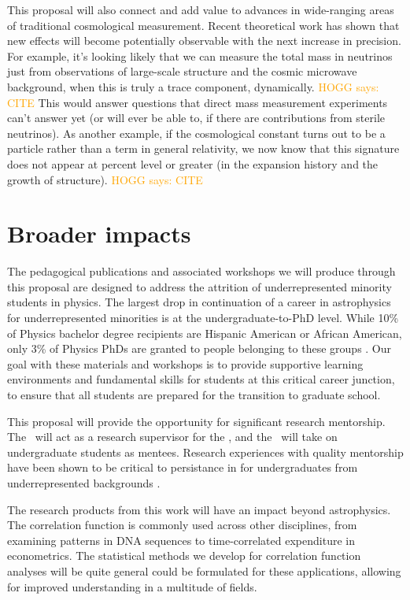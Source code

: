\documentclass[12pt, fullpage, letterpaper]{article}
\newcommand{\HOGG}[1]{\textcolor{orange}{HOGG says: #1}}
\begin{document}
This proposal will also connect and add value to advances in wide-ranging areas of traditional cosmological measurement.
Recent theoretical work has shown that new effects will become potentially observable with the next increase in precision.
For example, it's looking likely that we can measure the total mass in
neutrinos just from observations of large-scale structure and the
cosmic microwave background, when this is truly a trace component,
dynamically. \HOGG{CITE}
This would answer questions that direct mass measurement experiments
can't answer yet (or will ever be able to, if there are contributions from sterile neutrinos).
As another example, if the cosmological constant turns out to be a particle rather
than a term in general relativity, we now know that
this signature does not appear at percent level or greater (in the
expansion history and the growth of structure). \HOGG{CITE}

\section{Broader impacts}

The pedagogical publications and associated workshops we will produce through this proposal are designed to address the attrition of underrepresented minority students in physics.
The largest drop in continuation of a career in astrophysics for underrepresented minorities is at the undergraduate-to-PhD level.
While 10\% of Physics bachelor degree recipients are Hispanic American or African American, only 3\% of Physics PhDs are granted to people belonging to these groups \citep{Ivie2018}.
Our goal with these materials and workshops is to provide supportive learning environments and fundamental skills for students at this critical career junction, to ensure that all students are prepared for the transition to graduate school.

This proposal will provide the opportunity for significant research mentorship.
The \PI\ will act as a research supervisor for the \GRA, and the \GRA\ will take on undergraduate students as mentees.
Research experiences with quality mentorship have been shown to be critical to persistance in  for undergraduates from underrepresented backgrounds \citep{Estrada2018}.

The research products from this work will have an impact beyond astrophysics.
The correlation function is commonly used across other disciplines, from examining patterns in DNA sequences to time-correlated expenditure in econometrics.
The statistical methods we develop for correlation function analyses will be quite general could be formulated for these applications, allowing for improved understanding in a multitude of fields.
\end{document}
